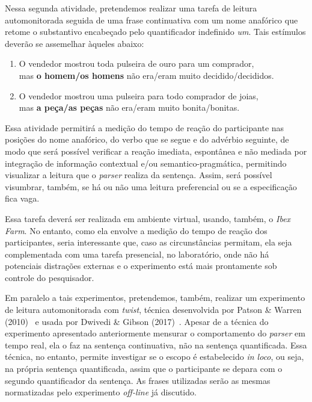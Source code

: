 Nessa segunda atividade, pretendemos realizar uma tarefa de leitura automonitorada seguida de uma frase continuativa com um nome anafórico que retome o substantivo encabeçado pelo quantificador indefinido \emph{um}. Tais estímulos deverão se assemelhar àqueles abaixo:

\begin{enumerate}[resume]
  \item O vendedor mostrou toda pulseira de ouro para um comprador,\\ mas \textbf{o homem/os homens} não era/eram muito decidido/decididos.
  \item O vendedor mostrou uma pulseira para todo comprador de joias,\\ mas \textbf{a peça/as peças} não era/eram muito bonita/bonitas.
\end{enumerate}

Essa atividade permitirá a medição do tempo de reação do participante nas posições do nome anafórico, do verbo que se segue e do advérbio seguinte, de modo que será possível verificar a reação imediata, espontânea e não mediada por integração de informação contextual e/ou semantico-pragmática, permitindo visualizar a leitura que o \emph{parser} realiza da sentença. Assim, será possível visumbrar, também, se há ou não uma leitura preferencial ou se a especificação fica vaga.

Essa tarefa deverá ser realizada em ambiente virtual, usando, também, o \emph{Ibex Farm}. No entanto, como ela envolve a medição do tempo de reação dos participantes, seria interessante que, caso as circunstâncias permitam, ela seja complementada com uma tarefa presencial, no laboratório, onde não há potenciais distrações externas e o experimento está mais prontamente sob controle do pesquisador.

Em paralelo a tais experimentos, pretendemos, também, realizar um experimento de leitura automonitorada com \emph{twist}, técnica desenvolvida por Patson \& Warren (2010)~\cite{PatWarren2010} e usada por Dwivedi \& Gibson (2017)~\cite{DwiGib2017}. Apesar de a técnica do experimento apresentado anteriormente mensurar o comportamento do \emph{parser} em tempo real, ela o faz na sentença continuativa, não na sentença quantificada. Essa técnica, no entanto, permite investigar se o escopo é estabelecido \emph{in loco}, ou seja, na própria sentença quantificada, assim que o participante se depara com o segundo quantificador da sentença. As frases utilizadas serão as mesmas normatizadas pelo experimento \emph{off-line} já discutido.

